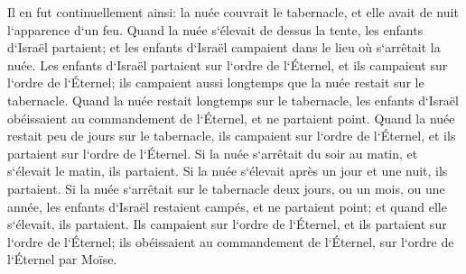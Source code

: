\verse Il en fut continuellement ainsi: la nuée couvrait le tabernacle, et elle avait de nuit l`apparence d`un feu. 
\verse Quand la nuée s`élevait de dessus la tente, les enfants d`Israël partaient; et les enfants d`Israël campaient dans le lieu où s`arrêtait la nuée. 
\verse Les enfants d`Israël partaient sur l`ordre de l`Éternel, et ils campaient sur l`ordre de l`Éternel; ils campaient aussi longtemps que la nuée restait sur le tabernacle. 
\verse Quand la nuée restait longtemps sur le tabernacle, les enfants d`Israël obéissaient au commandement de l`Éternel, et ne partaient point. 
\verse Quand la nuée restait peu de jours sur le tabernacle, ils campaient sur l`ordre de l`Éternel, et ils partaient sur l`ordre de l`Éternel. 
\verse Si la nuée s`arrêtait du soir au matin, et s`élevait le matin, ils partaient. Si la nuée s`élevait après un jour et une nuit, ils partaient. 
\verse Si la nuée s`arrêtait sur le tabernacle deux jours, ou un mois, ou une année, les enfants d`Israël restaient campés, et ne partaient point; et quand elle s`élevait, ils partaient. 
\verse Ils campaient sur l`ordre de l`Éternel, et ils partaient sur l`ordre de l`Éternel; ils obéissaient au commandement de l`Éternel, sur l`ordre de l`Éternel par Moïse. 


